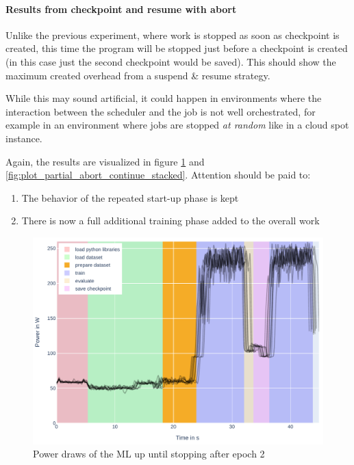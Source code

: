 \paragraph{Results from checkpoint and resume with abort}

Unlike the previous experiment, where work is stopped as soon as checkpoint is created, this time the program will be stopped just before a checkpoint is created (in this case just the second checkpoint would be saved). 
This should show the maximum created overhead from a suspend \& resume strategy. 

While this may sound artificial, it could happen in environments where the interaction between the scheduler and the job is not well orchestrated, for example in an environment where jobs are stopped \emph{at random} like in a cloud spot instance.

Again, the results are visualized in figure \ref{fig:plot_partial_abort_stacked} and \ref{fig:plot_partial_abort_continue_stacked}. Attention should be paid to:

\begin{enumerate}
    \item The behavior of the repeated start-up phase is kept
    \item There is now a full additional training phase added to the overall work
\end{enumerate}

\begin{figure}
    \includegraphics[width=\linewidth]{power-measurements/stacked_plots/roberta_stop_without_saving.pdf}
    \caption{Power draws of the ML up until stopping after epoch 2}
    \label{fig:plot_partial_abort_stacked}
\end{figure}

